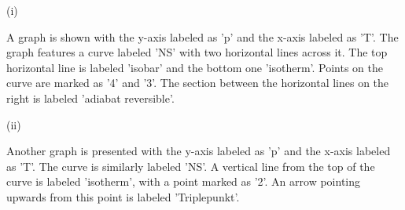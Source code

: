 (i)

A graph is shown with the y-axis labeled as 'p' and the x-axis labeled as 'T'. The graph features a curve labeled 'NS' with two horizontal lines across it. The top horizontal line is labeled 'isobar' and the bottom one 'isotherm'. Points on the curve are marked as '4' and '3'. The section between the horizontal lines on the right is labeled 'adiabat reversible'.

(ii)

Another graph is presented with the y-axis labeled as 'p' and the x-axis labeled as 'T'. The curve is similarly labeled 'NS'. A vertical line from the top of the curve is labeled 'isotherm', with a point marked as '2'. An arrow pointing upwards from this point is labeled 'Triplepunkt'.